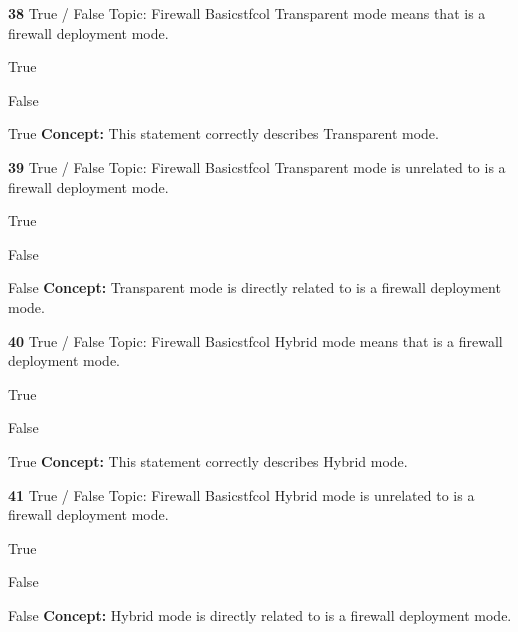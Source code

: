 \documentclass[10pt,a4paper]{article}
\begin{document}
\begin{qcard}{\color{white}\textbf{38} \hfill \small True / False \textbar{} Topic: Firewall Basics}{tfcol}
Transparent mode means that is a firewall deployment mode.

\begin{qoptions}
\item True
\item False
\end{qoptions}
\begin{explainbox}{True}
\textbf{Concept:} This statement correctly describes Transparent mode.
\end{explainbox}
\end{qcard}

\begin{qcard}{\color{white}\textbf{39} \hfill \small True / False \textbar{} Topic: Firewall Basics}{tfcol}
Transparent mode is unrelated to is a firewall deployment mode.

\begin{qoptions}
\item True
\item False
\end{qoptions}
\begin{explainbox}{False}
\textbf{Concept:} Transparent mode is directly related to is a firewall deployment mode.
\end{explainbox}
\end{qcard}

\begin{qcard}{\color{white}\textbf{40} \hfill \small True / False \textbar{} Topic: Firewall Basics}{tfcol}
Hybrid mode means that is a firewall deployment mode.

\begin{qoptions}
\item True
\item False
\end{qoptions}
\begin{explainbox}{True}
\textbf{Concept:} This statement correctly describes Hybrid mode.
\end{explainbox}
\end{qcard}

\begin{qcard}{\color{white}\textbf{41} \hfill \small True / False \textbar{} Topic: Firewall Basics}{tfcol}
Hybrid mode is unrelated to is a firewall deployment mode.

\begin{qoptions}
\item True
\item False
\end{qoptions}
\begin{explainbox}{False}
\textbf{Concept:} Hybrid mode is directly related to is a firewall deployment mode.
\end{explainbox}
\end{qcard}
\end{document}
